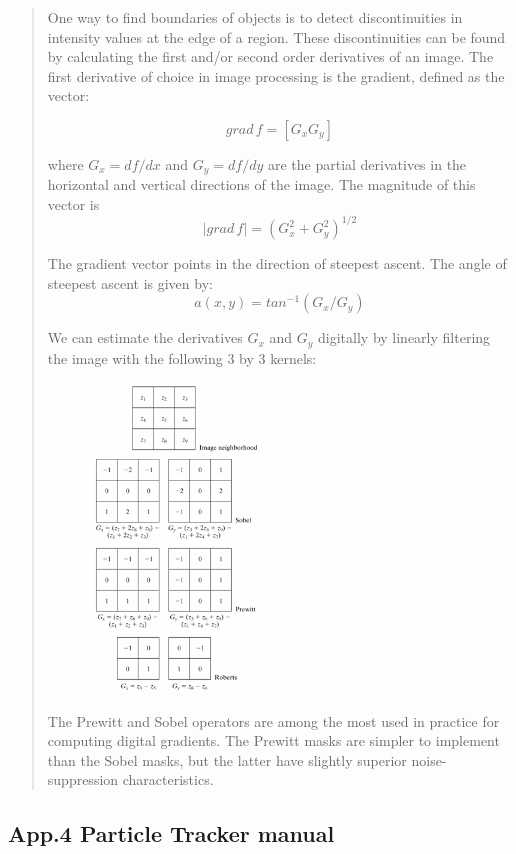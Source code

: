 \begin{quote}
One way to find boundaries of objects is to detect discontinuities in
intensity values at the edge of a region. These discontinuities can
be found by calculating the first and/or second order derivatives of an
image. The first derivative of choice in image processing is the
gradient, defined as the vector:

\[
grad\, f=[G_{x}G_{y}]
\] 

where 
$G_{x}=df/dx$ 
 and
$G_{y}=df/dy$ 
 are the partial derivatives in the horizontal and
vertical directions of the image. The magnitude of this vector is
\[
\left |  grad\, f\right |=(G_{x}^{2}+G_{y}^{2})^{1/2}
\]

The gradient vector points in the direction of steepest ascent. The
angle of steepest ascent is given by:
\[
a(x,y)=tan^{-1}(G_{x}/G_{y})
\]

We can estimate the derivatives $G_{x}$ and $G_{y}$ digitally by linearly
filtering the image with the following 3 by 3 kernels: 

\includegraphics[width=6.653cm,height=8.221cm]{fig/CMCIBasicCourse201102-img153.png}

The Prewitt and Sobel operators are among the most used in practice for
computing digital gradients. The Prewitt masks are simpler to
implement than the Sobel masks, but the latter have slightly superior
noise-suppression characteristics.
\end{quote}

\clearpage

\subsection{App.4 Particle Tracker manual}
\label{app4}

